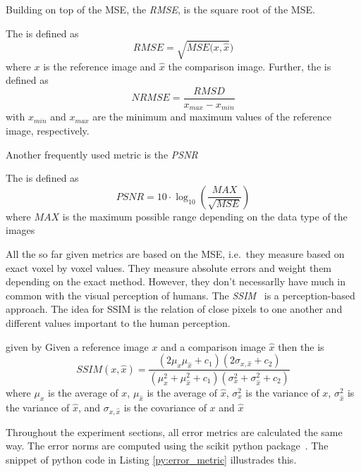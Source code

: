Building on top of the \gls{MSE}, the \textit{\gls{RMSE}}, is the square root of the
\gls{MSE}.
\begin{definition}
	The \textit{} is defined as
	\[ RMSE = \sqrt{MSE(x, \hat{x}}) \]
	where \(x\) is the reference image and \(\hat{x}\) the comparison image. Further, the
	\textit{} is defined as
	\[ NRMSE = \frac{RMSD}{x_{max} - x_{min}} \]
	with \(x_{min}\) and \(x_{max}\) are the minimum and maximum values of the reference image,
	respectively.
\end{definition}
Another frequently used metric is the \textit{\gls{PSNR}}
\begin{definition}
	The \textit{} is defined as
	\[ PSNR = 10 \cdot \log_{10}\left( \frac{MAX}{\sqrt{MSE}} \right) \]
	where \(MAX\) is the maximum possible range depending on the data type of the images
\end{definition}
All the so far given metrics are based on the \gls{MSE}, i.e.\ they measure based on exact voxel by
voxel values. They measure absolute errors and weight them depending on the exact method. However,
they don't necessarlly have much in common with the visual perception of humans. The
\textit{\gls{SSIM}}~\cite{wang_image_2004,avanaki_exact_2009} is a perception-based approach. The
idea for \gls{SSIM} is the relation of close pixels to one another and different values important to
the human perception.
\begin{definition}
	given by Given a reference image \(x\) and a comparison image \(\hat{x}\) then the
	\textit{} is
	\[ SSIM(x, \hat{x}) = \frac{\left(2 \mu_x \mu_{\hat{x}} + c_1\right) \left( 2
			\sigma_{x, \hat{x}} + c_2 \right)}{\left(\mu_x^2
			+ \mu_{\hat{x}}^2 + c_1 \right) \left( \sigma_x^2 + \sigma_{\hat{x}}^2 + c_2 \right)} \]
	where \(\mu_x\) is the average of \(x\), \(\mu_{\hat{x}}\) is the average of \(\hat{x}\),
	\(\sigma_x^2\) is the variance of \(x\), \(\sigma_{\hat{x}}^2\) is the variance of
	\(\hat{x}\), and \(\sigma_{x, \hat{x}}\) is the covariance of \(x\) and \(\hat{x}\)
\end{definition}

Throughout the experiment sections, all error metrics are calculated the same way. The error norms
are computed using the scikit python package~\cite{van_der_walt_scikit-image_2014}. The snippet of
python code in Listing \autoref{py:error_metric} illustrades this.

